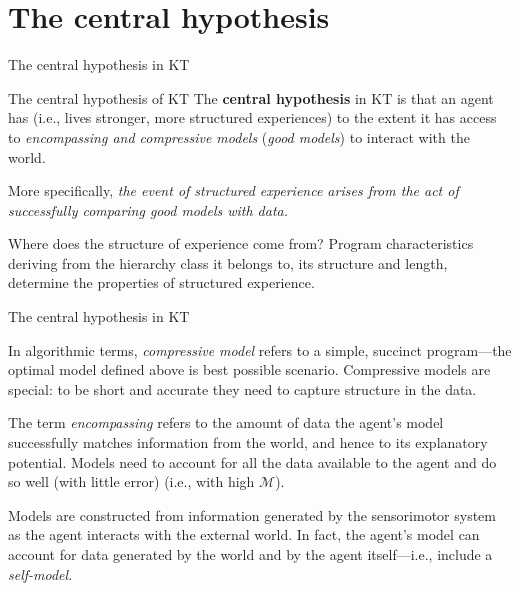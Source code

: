 \section{The central hypothesis}

\begin{frame}[label=ladila]{The central hypothesis in KT}

\begin{exampleblock}{The central hypothesis of KT}
The {\bf central hypothesis} in KT is that an agent has \SEP (i.e., lives stronger, more structured experiences) to the extent it has access to {\em encompassing and compressive models} ({\em good models}) to interact with the world.  

\vspace{0.5cm}

More specifically,  {\em the event  of structured experience  arises from the act of successfully comparing  good models with data. }   \vfill
\end{exampleblock}
 \vfill

Where does the structure of experience come from? {Program characteristics deriving from  the hierarchy class it belongs to, its structure and  length, determine the properties of structured experience. }


\end{frame}

\begin{frame}[label=ladila]{The central hypothesis in KT}
 
   In algorithmic terms, {\em compressive model} refers to a simple, succinct program---the optimal model defined above is best possible scenario. Compressive models are special: to be short and accurate they need to capture structure in the data.   \vfill
    
      The term {\em encompassing} refers to the amount of data  the agent's model successfully matches information from the world, and hence to its explanatory potential.   Models need to account for all the data available  to the agent  and do so well (with little error) (i.e., with high $\mathcal M$).\vfill
    
    Models are constructed from information generated by the sensorimotor system as the agent interacts with the external world. In fact, the agent's model can account for data generated by the world and by the agent itself---i.e., include a {\em self-model}.
    
 
\end{frame}